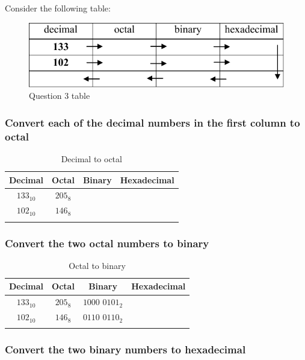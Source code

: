 \documentclass[12pt,a4paper]{article}
\begin{document}
Consider the following table:

\begin{figure}[h]
\centering
\caption{Question 3 table}
\includegraphics[scale=1]{./img/table_q3-A.pdf}
\end{figure}

\subsubsection{Convert each of the decimal numbers in the first column to octal}

\begin{table}[!h]
\centering
\caption{Decimal to octal}
\begin{tabular}{c|c|c|c}
Decimal & Octal & Binary & Hexadecimal \\
\hline
$133_{10}$ & $205_{8}$ &  &  \\
\hline
$102_{10}$ & $146_{8}$ &  &  \\
\hline
  &  &  &
\end{tabular}
\end{table}

\subsubsection{Convert the two octal numbers to binary}

\begin{table}[!h]
\centering
\caption{Octal to binary}
\begin{tabular}{c|c|c|c}
Decimal & Octal & Binary & Hexadecimal \\
\hline
$133_{10}$ & $205_{8}$ & $1000$ $0101_{2}$ &  \\
\hline
$102_{10}$ & $146_{8}$ & $0110$ $0110_{2}$ &  \\
\hline
  &  &  &
\end{tabular}
\end{table}

\subsubsection{Convert the two binary numbers to hexadecimal}
\end{document}
